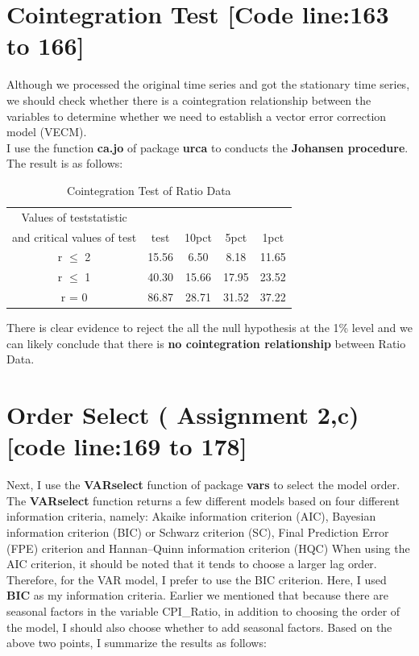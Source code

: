 \documentclass{report}
\begin{document}
\section{Cointegration Test [Code line:163 to 166]}

Although we processed the original time series and got the stationary time series, we should check whether there is a cointegration relationship between the variables to determine whether we need to establish a vector error correction model (VECM). \\
I use the function \textbf{ca.jo} of package \textbf{urca} to conducts the \textbf{Johansen procedure}. The result is as follows:

\begin{table}[H]
\centering
 \caption{\label{tab:coin test} Cointegration Test of Ratio Data}
 \begin{tabular}{ccccc}
  \toprule
  Values of teststatistic \\and critical values of test & test& 10pct & 5pct& 1pct \\
  \midrule
r $\leq$ 2 & 15.56 & 6.50&  8.18 &11.65 \\
r $\leq$ 1 & 40.30& 15.66& 17.95 &23.52\\
r = 0  &86.87 &28.71 &31.52 &37.22\\

  \bottomrule
 \end{tabular}
\end{table}

There is clear evidence to reject the all the null hypothesis at the 1\% level and we can likely conclude that there is \textbf{no cointegration relationship } between Ratio Data.

\section{Order Select ( Assignment 2,c) [code line:169 to 178]}

Next, I use the  \textbf{VARselect} function of package \textbf{vars} to select the model order. The \textbf{VARselect} function returns a few different models based on four different information criteria, namely:
 Akaike information criterion (AIC),
Bayesian information criterion (BIC) or Schwarz criterion (SC),
Final Prediction Error (FPE) criterion and 
Hannan–Quinn information criterion (HQC)
When using the AIC criterion, it should be noted that it tends to choose a larger lag order. Therefore, for the VAR model, I prefer to use the BIC criterion. Here, I used \textbf{BIC} as my information criteria.
Earlier we mentioned that because there are seasonal factors in the variable CPI\_Ratio, in addition to choosing the order of the model, I should also choose whether to add seasonal factors.
Based on the above two points, I summarize the results as follows:
\end{document}
